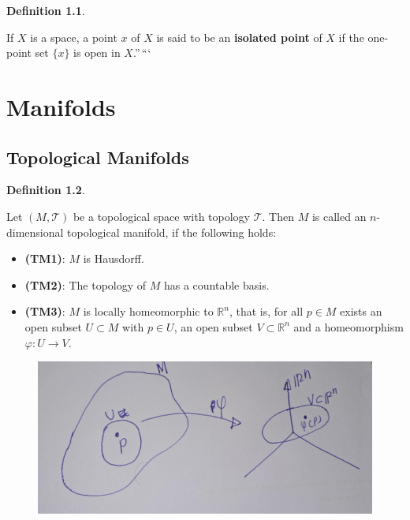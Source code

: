 \documentclass[
]{book}
\providecommand{\tightlist}{%
  \setlength{\itemsep}{0pt}\setlength{\parskip}{0pt}}
\theoremstyle{definition}
\newtheorem{definition}{Definition}[chapter]
\theoremstyle{definition}
\theoremstyle{definition}
\theoremstyle{definition}
\theoremstyle{remark}
\begin{document}
\begin{definition}
\protect\hypertarget{def:unnamed-chunk-6}{}\label{def:unnamed-chunk-6}

If \(X\) is a space, a point \(x\) of \(X\) is said to be an \textbf{isolated point} of \(X\) if the one-point set \(\{x\}\) is open in \(X\).''\,```

\hypertarget{manifolds}{%
\chapter{Manifolds}\label{manifolds}}

\hypertarget{topological-manifolds}{%
\section{Topological Manifolds}\label{topological-manifolds}}

\end{definition}

\begin{definition}
\protect\hypertarget{def:topmanifold}{}\label{def:topmanifold}

Let \((M,\mathcal{T})\) be a topological space with topology \(\mathcal{T}\). Then \(M\) is called an \(n\)-dimensional topological manifold, if the following holds:

\begin{itemize}
\tightlist
\item
  \textbf{(TM1)}: \(M\) is Hausdorff.
\item
  \textbf{(TM2)}: The topology of \(M\) has a countable basis.
\item
  \textbf{(TM3)}: \(M\) is locally homeomorphic to \(\mathbb{R}^n\), that is, for all \(p \in M\) exists an open subset \(U \subset M\) with \(p \in U\), an open subset \(V \subset \mathbb{R}^n\) and a homeomorphism \(\varphi : U \rightarrow V\).
\end{itemize}

\end{definition}

\begin{figure}
\centering
\includegraphics{figures/ch1/fig02.jpg}
\caption{\label{fig:fig02}\(~\)}
\end{figure}
\end{document}
